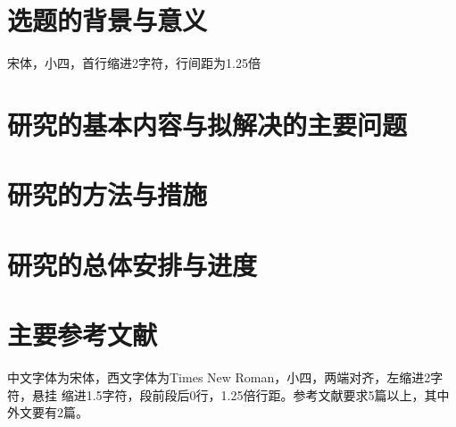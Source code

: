 \section{选题的背景与意义}

\begin{tcolorbox}
    宋体，小四，首行缩进2字符，行间距为1.25倍
\end{tcolorbox}

\lipsum[1]\cite{Bohan1928,chen1980zhongguo}

\section{研究的基本内容与拟解决的主要问题}

\lipsum[2-4]\cite{chen2005zhulu,chu2004tushu,yuan2012lanc}

\section{研究的方法与措施}

\lipsum[5-7]\cite{lamport1986document,niu2013zonghe}

\section{研究的总体安排与进度}

\lipsum[8-11]\cite{wikibook2014latex,Dubrovin1906,hls2012jinji}

\section{主要参考文献}

\begin{tcolorbox}
    中文字体为宋体，西文字体为Times New Roman，小四，两端对齐，左缩进2字符，悬挂
    缩进1.5字符，段前段后0行，1.25倍行距。参考文献要求5篇以上，其中外文要有2篇。
\end{tcolorbox}

